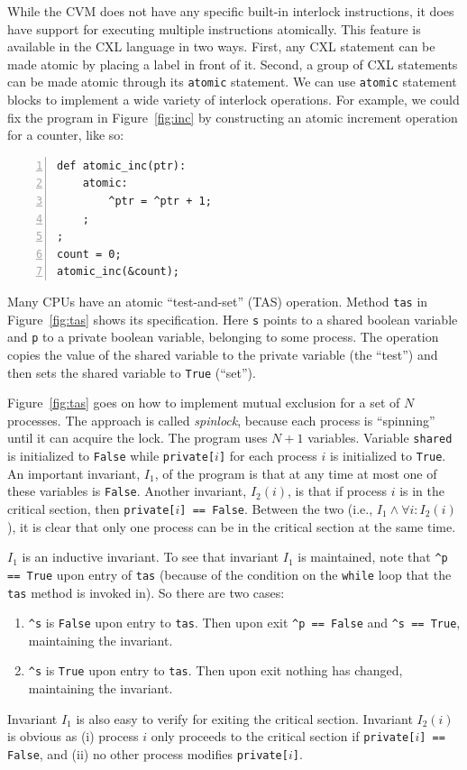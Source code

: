 \documentclass{report}
\newenvironment{code}{
\tcolorbox
}{
\endtcolorbox
}
\begin{document}
While the CVM does not have any specific built-in interlock instructions,
it does have support for executing multiple instructions atomically.
This feature is available in the CXL language in two ways.
First, any CXL statement can be made atomic by placing a label in front
of it.  Second, a group of CXL statements can be made atomic
through its \texttt{atomic}
statement.
We can use \texttt{atomic} statement blocks to implement a wide variety of
interlock operations.
For example, we could fix the program in Figure~\ref{fig:inc} by
constructing an atomic increment operation for a counter, like so:
\begin{code}
\begin{Verbatim}[xleftmargin=5mm,numbers=left]
def atomic_inc(ptr):
    atomic:
        ^ptr = ^ptr + 1;
    ;
;
count = 0;
atomic_inc(&count);
\end{Verbatim}
\end{code}

Many CPUs have an atomic ``test-and-set'' (TAS)
operation.
Method \texttt{tas} in Figure~\ref{fig:tas} shows its specification.
Here \texttt{s} points to a shared boolean variable and \texttt{p}
to a private boolean variable, belonging to some process.
The operation copies the value of the shared variable to the
private variable (the ``test'')
and then sets the shared variable to \texttt{True} (``set'').

Figure~\ref{fig:tas} goes on how to implement mutual exclusion for
a set of $N$ processes.
The approach is called \emph{spinlock},
because each process is ``spinning'' until
it can acquire the lock.
The program uses $N+1$ variables.
Variable \texttt{shared} is initialized to \texttt{False} while
\texttt{private[$i$]} for each process $i$ is initialized to \texttt{True}.
An important invariant, $I_1$, of the program is that at any time at most
one of these variables is \texttt{False}.
Another invariant, $I_2(i)$, is that if process $i$ is in the critical section,
then \texttt{private[$i$] == False}.
Between the two (i.e., $I_1 \land \forall i: I_2(i)$),
it is clear that only one process can be in the
critical section at the same time.

$I_1$ is an inductive invariant.
To see that invariant $I_1$ is maintained, note that
\texttt{\^{}p == True} upon entry of \texttt{tas}
(because of the condition on the \texttt{while} loop that the
\texttt{tas} method is invoked in).
So there are two cases:
\begin{enumerate}
\item \texttt{\^{}s} is \texttt{False} upon entry to \texttt{tas}.
Then upon exit \texttt{\^{}p == False} and \texttt{\^{}s == True}, maintaining
the invariant.
\item \texttt{\^{}s} is \texttt{True} upon entry to \texttt{tas}.
Then upon exit nothing has changed, maintaining the invariant.
\end{enumerate}
Invariant $I_1$ is also easy to verify for exiting the critical section.
Invariant $I_2(i)$ is obvious as (i) process $i$ only proceeds to the critical
section if \texttt{private[$i$] == False}, and (ii) no other process modifies
\texttt{private[$i$]}.
\end{document}
